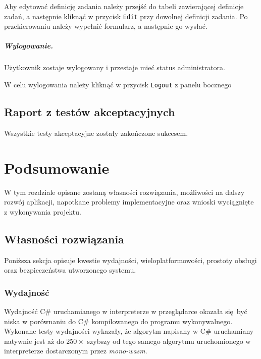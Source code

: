 \documentclass[a4paper,11pt,twoside]{report}
\theoremstyle{definition}
\begin{document}
                Aby edytować definicję zadania należy przejść do tabeli zawierającej definicje zadań, a następnie kliknąć w przycisk \texttt{Edit} przy dowolnej definicji zadania. Po przekierowaniu należy wypełnić formularz, a następnie go wysłać.

            \paragraph{Wylogowanie.}
                \noindent Użytkownik zostaje wylogowany i przestaje mieć status administratora.

                W celu wylogowania należy kliknąć w przycisk \texttt{Logout} z panelu bocznego


            \subsubsection{}    
            
    \section{Raport z testów akceptacyjnych}
    
        Wszystkie testy akceptacyjne zostały zakończone sukcesem.

\chapter{Podsumowanie}

    W tym rozdziale opisane zostaną własności rozwiązania, możliwości na dalszy rozwój aplikacji,
    napotkane problemy implementacyjne oraz wnioski wyciągnięte z wykonywania projektu.

    \section{Własności rozwiązania}
        \label{wlasnosci-rozwiazania}
        Poniższa sekcja opisuje kwestie wydajności, wieloplatformowości, prostoty obsługi oraz bezpieczeństwa utworzonego systemu.
        
        \subsection{Wydajność}
            Wydajność C\# uruchamianego w interpreterze w przeglądarce okazała się być niska w porównaniu do C\# kompilowanego do programu wykonywalnego.
            Wykonane testy wydajności wykazały, że algorytm napisany w C\# uruchamiany natywnie jest aż do $250\times$ szybszy od tego samego algorytmu uruchomionego w interpreterze dostarczonym przez \textit{mono-wasm}.
            
\end{document}
